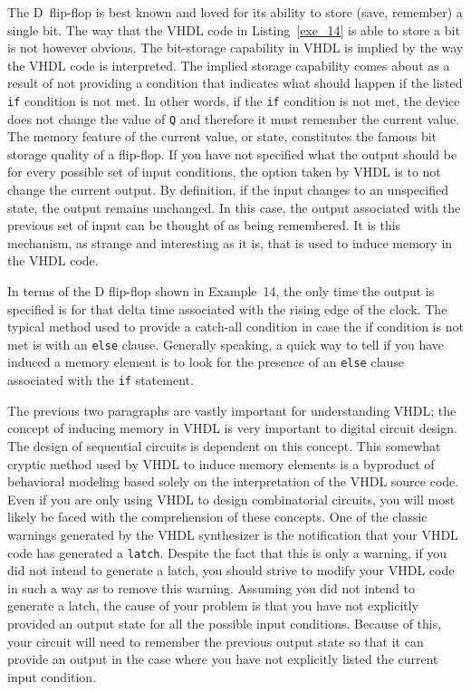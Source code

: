 The D~flip-flop is best known and loved for its ability to store (save, remember) a single bit. The way that the VHDL code in Listing~\ref{exe_14} is able to store a bit is not however obvious. The bit-storage capability in VHDL is implied by the way the VHDL code is interpreted. The implied storage capability comes about as a result of not providing a condition that indicates what should happen if the listed \texttt{if} condition is not met. In other words, if the \texttt{if} condition is not met, the device does not change the value of \texttt{Q} and therefore it must remember the current value. The memory feature of the current value, or state, constitutes the famous bit storage quality of a flip-flop. If you have not specified what the output should be for every possible set of input conditions, the option taken by VHDL is to not change the current output. By definition, if the input changes to an unspecified state, the output remains unchanged. In this case, the output associated with the previous set of input can be thought of as being remembered. It is this mechanism, as strange and interesting as it is, that is used to induce memory in the VHDL code.

In terms of the D flip-flop shown in Example~14, the only time the output is specified is for that delta time associated with the rising edge of the clock. The typical method used to provide a catch-all condition in case the if condition is not met is with an \texttt{else} clause. Generally speaking, a quick way to tell if you have induced a memory element is to look for the presence of an \texttt{else} clause associated with the \texttt{if} statement.

The previous two paragraphs are vastly important for understanding VHDL; the concept of inducing memory in VHDL is very important to digital circuit design. The design of sequential circuits is dependent on this concept. This somewhat cryptic method used by VHDL to induce memory elements is a byproduct of behavioral modeling based solely on the interpretation of the VHDL source code. Even if you are only using VHDL to design combinatorial circuits, you will most likely be faced with the comprehension of these concepts. One of the classic warnings generated by the VHDL synthesizer is the notification that your VHDL code has generated a \texttt{latch}. Despite the fact that this is only a warning, if you did not intend to generate a latch, you should strive to modify your VHDL code in such a way as to remove this warning. Assuming you did not intend to generate a latch, the cause of your problem is that you have not explicitly provided an output state for all the possible input conditions. Because of this, your circuit will need to remember the previous output state so that it can provide an output in the case where you have not explicitly listed the current input condition.


